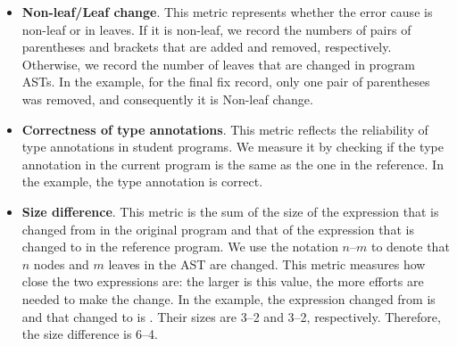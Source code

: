 \documentclass[12pt]{report}	%
\begin{document}
\begin{itemize}[noitemsep]

\item \textbf{Non-leaf/Leaf change}.
This metric represents whether the error cause is non-leaf or in leaves.
If it is non-leaf, we record the numbers of pairs of parentheses and
brackets that are added and
removed, respectively. 
Otherwise,
we record the number of leaves that are changed in program ASTs.
In the  example, for the
final fix record,
only one pair of parentheses was
removed,
and consequently it is Non-leaf change.


\item  \textbf{Correctness of type annotations}.
This metric reflects the reliability of type annotations in student programs.
We measure it by checking if the type annotation in the current program
is the same as the one in the reference.
In the  example, the type annotation is correct.


\item \textbf{Size difference}.
This metric is the sum of the size of the expression
that is changed from in the original program
and
that of the expression that is 
changed to in the reference program. 
We use the notation $n$--$m$ to denote that
$n$ nodes and $m$ leaves in the AST are changed.
This metric measures how close the two
expressions are: the larger is this value, the more efforts are needed to
make the change.
In the  example, 
the expression changed from is
 and that changed to is .
Their sizes are 3--2 and 3--2, respectively.
Therefore, the size difference is 6--4.


\end{itemize}
\end{document}
